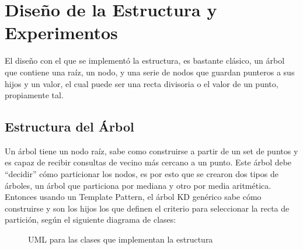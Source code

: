 \documentclass[12pt,letterpaper, margin = 3cm]{article}
\begin{document}
\newpage
\section{Diseño de la Estructura y Experimentos}
El diseño con el que se implementó la estructura, es bastante clásico, un árbol que contiene una raíz, un nodo, y una serie de nodos que guardan punteros a sus hijos y un valor, el cual puede ser una recta divisoria o el valor de un punto, propiamente tal.

\subsection{Estructura del Árbol}
Un árbol tiene un nodo raíz, sabe como construirse a partir de un set de puntos y es capaz de recibir consultas de vecino más cercano a un punto. Este árbol debe ``decidir'' cómo particionar los nodos, es por esto que se crearon dos tipos de árboles, un árbol que particiona por mediana y otro por media aritmética. Entonces usando un Template Pattern, el árbol KD genérico sabe cómo construirse y son los hijos los que definen el criterio para seleccionar la recta de partición, según el siguiente diagrama de clases:

\begin{figure}[ht!]
 \centering
{}
 \caption{UML para las clases que implementan la estructura}
\end{figure}
\end{document}

